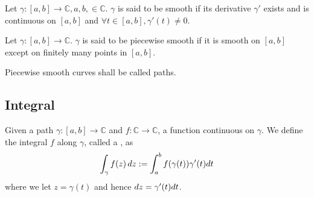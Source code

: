 \documentclass[notoc,notitlepage]{tufte-book}
\begin{document}
\begin{defn}\label{defn:smooth_curve}
	Let $\gamma : [a, b] \to \mathbb{C}, a, b, \in \mathbb{C}$. $\gamma$ is said to be smooth if its derivative $\gamma'$ exists and is continuous on $[a, b]$ and $\forall t \in [a, b], \gamma'(t) \neq 0$.
\end{defn}

\begin{defn}\label{defn:piecewise_smooth}
	Let $\gamma: [a, b] \to \mathbb{C}$. $\gamma$ is said to be piecewise smooth if it is smooth on $[a, b]$ except on finitely many points in $[a, b]$.
\end{defn}

\begin{remark}
	Piecewise smooth curves shall be called paths.
\end{remark}


\subsection{Integral} %
\label{sub:integral}

\begin{defn}[Contour]\label{defn:contour}
	Given a path $\gamma: [a, b] \to \mathbb{C}$ and $f : \mathbb{C} \to \mathbb{C}$, a function continuous on $\gamma$. We define the integral $f$ along $\gamma$, called a , as
	\begin{equation}
		\int_{\gamma} f(z) \mathop{}\!d{z} := \int_{a}^{b} f(\gamma(t))\gamma'(t) dt
	\end{equation}
	where we let $z = \gamma(t)$ and hence $\mathop{}\!d{z} = \gamma'(t) dt$.
\end{defn}
\end{document}
